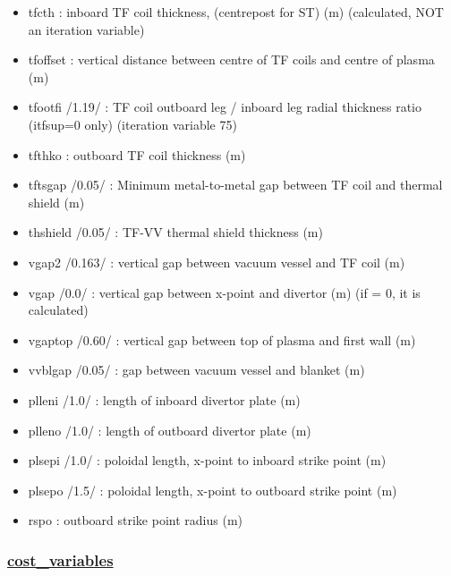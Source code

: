 \documentclass[]{article}
\begin{document}
\begin{itemize}
\begin{itemize}
  \item
    tfcth : inboard TF coil thickness, (centrepost for ST) (m)
    (calculated, NOT an iteration variable)
  \item
    tfoffset : vertical distance between centre of TF coils and centre
    of plasma (m)
  \item
    tfootfi /1.19/ : TF coil outboard leg / inboard leg radial thickness
    ratio (itfsup=0 only) (iteration variable 75)
  \item
    tfthko : outboard TF coil thickness (m)
  \item
    tftsgap /0.05/ : Minimum metal-to-metal gap between TF coil and
    thermal shield (m)
  \item
    thshield /0.05/ : TF-VV thermal shield thickness (m)
  \item
    vgap2 /0.163/ : vertical gap between vacuum vessel and TF coil (m)
  \item
    vgap /0.0/ : vertical gap between x-point and divertor (m) (if = 0,
    it is calculated)
  \item
    vgaptop /0.60/ : vertical gap between top of plasma and first wall
    (m)
  \item
    vvblgap /0.05/ : gap between vacuum vessel and blanket (m)
  \item
    plleni /1.0/ : length of inboard divertor plate (m)
  \item
    plleno /1.0/ : length of outboard divertor plate (m)
  \item
    plsepi /1.0/ : poloidal length, x-point to inboard strike point (m)
  \item
    plsepo /1.5/ : poloidal length, x-point to outboard strike point (m)
  \item
    rspo : outboard strike point radius (m)
  \end{itemize}

  \subsubsection{\texorpdfstring{\href{cost_variables.html}{cost\_variables}}{cost\_variables}}\label{cost_variables}


\end{itemize}
\end{document}

